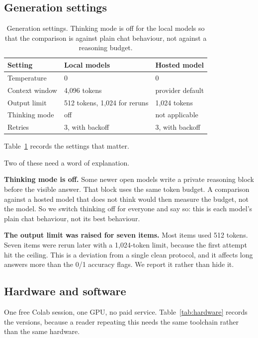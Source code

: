 \documentclass[11pt,a4paper]{article}
\begin{document}
\subsection{Generation settings}

\begin{table}[htbp]
\centering
\caption{Generation settings. Thinking mode is off for the local models so that the comparison is against plain chat behaviour, not against a reasoning budget.}
\label{tab:settings}
\begin{tabular}{@{}lll@{}}
\toprule
Setting & Local models & Hosted model \\
\midrule
Temperature & 0 & 0 \\
Context window & 4,096 tokens & provider default \\
Output limit & 512 tokens, 1,024 for reruns & 1,024 tokens \\
Thinking mode & off & not applicable \\
Retries & 3, with backoff & 3, with backoff \\
\bottomrule
\end{tabular}
\end{table}

Table~\ref{tab:settings} records the settings that matter.

Two of these need a word of explanation.

\textbf{Thinking mode is off.} Some newer open models write a private reasoning block before the visible answer. That block uses the same token budget. A comparison against a hosted model that does not think would then measure the budget, not the model. So we switch thinking off for everyone and say so: this is each model's plain chat behaviour, not its best behaviour.

\textbf{The output limit was raised for seven items.} Most items used 512 tokens. Seven items were rerun later with a 1,024-token limit, because the first attempt hit the ceiling. This is a deviation from a single clean protocol, and it affects long answers more than the 0/1 accuracy flags. We report it rather than hide it.

\subsection{Hardware and software}

One free Colab session, one GPU, no paid service. Table~\ref{tab:hardware} records the versions, because a reader repeating this needs the same toolchain rather than the same hardware.
\end{document}
